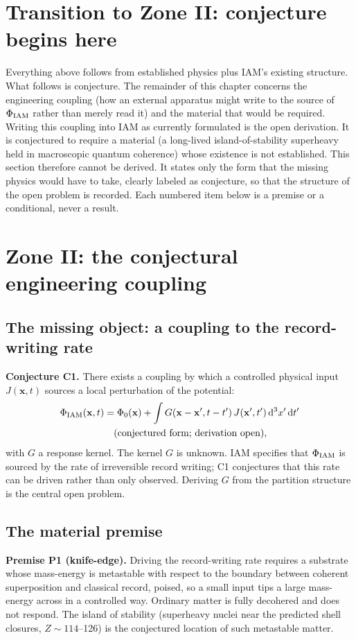 \section{Transition to Zone II: conjecture begins here}\label{sec:ge_transition}
Everything above follows from established physics plus IAM's existing structure. What follows is conjecture. The remainder of this chapter concerns the
engineering coupling (how an external apparatus might write to the source of $\Phi_{\rm IAM}$ rather than merely read it) and the material that would
be required. Writing this coupling into IAM as currently formulated is the open derivation. It is conjectured to require a material (a long-lived island-of-stability superheavy held in macroscopic quantum coherence) whose existence is not established. This section therefore cannot be
derived. It states only the form that the missing physics would have to take, clearly labeled as conjecture, so that the structure of the open
problem is recorded. Each numbered item below is a premise or a conditional, never a result.

\section{Zone II: the conjectural engineering coupling}\label{sec:ge_zone2}

\subsection{The missing object: a coupling to the record-writing rate}
\textbf{Conjecture C1.} There exists a coupling by which a controlled physical input $J(\mathbf x,t)$ sources a local perturbation of the potential:
\begin{equation}
\begin{aligned}\Phi_{\rm IAM}(\mathbf x,t)&=\Phi_0(\mathbf x)+\int G(\mathbf x-\mathbf x',t-t')\,J(\mathbf x',t')\,\mathrm d^3x'\,\mathrm dt'
\\&\quad\text{(conjectured form; derivation open)},\end{aligned}
\label{eq:ge_kernel}
\end{equation}
with $G$ a response kernel. \conjecture{} The kernel $G$ is unknown. IAM specifies that $\Phi_{\rm IAM}$ is sourced by the rate of irreversible record
writing; C1 conjectures that this rate can be driven rather than only observed. Deriving $G$ from the partition structure is the central open problem. \openprob

\subsection{The material premise}
\textbf{Premise P1 (knife-edge).} Driving the record-writing rate requires a substrate whose mass-energy is metastable with respect to the boundary
between coherent superposition and classical record, poised, so a small input tips a large mass-energy across in a controlled way. Ordinary matter is
fully decohered and does not respond. The island of stability (superheavy nuclei near the predicted shell closures, $Z\sim114$--126) is the conjectured
location of such metastable matter. \conjecture

